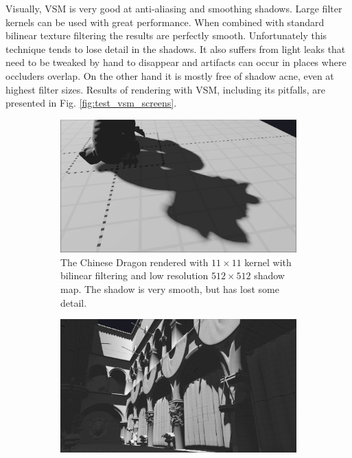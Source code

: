 Visually, VSM is very good at anti-aliasing and smoothing shadows. Large filter kernels can be used with great performance. When combined with standard bilinear texture filtering the results are perfectly smooth. Unfortunately this technique tends to lose detail in the shadows. It also suffers from light leaks that need to be tweaked by hand to disappear and artifacts can occur in places where occluders overlap. On the other hand it is mostly free of shadow acne, even at highest filter sizes. Results of rendering with VSM, including its pitfalls, are presented in Fig. \ref{fig:test_vsm_screens}.

\begin{figure}[h]
    \centering
    \begin{subfigure}[t]{0.49\textwidth}
		\centering
        \includegraphics[width=\textwidth]{./graf/tests/vsm/cropped/dragon_vsm_512_23_smooth.png}
        \caption{The Chinese Dragon rendered with \(11\times 11\) kernel with bilinear filtering and low resolution \(512\times 512\) shadow map. The shadow is very smooth, but has lost some detail.}
    \end{subfigure}
	\hfill
    \begin{subfigure}[t]{0.49\textwidth}
		\centering
        \includegraphics[width=\textwidth]{./graf/tests/vsm/cropped/sponza_vsm_4096_23.png}

\end{subfigure}
\end{figure}
